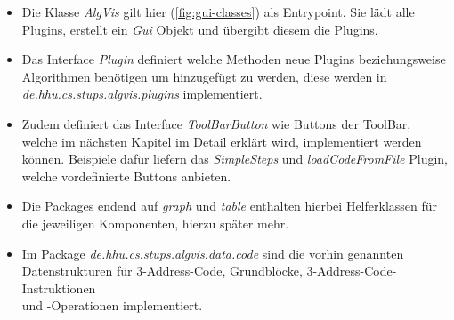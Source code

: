 \newpage
\begin{itemize}
  \item Die Klasse \textit{AlgVis} gilt hier (\cref{fig:gui-classes}) als Entrypoint. 
    Sie lädt alle Plugins, erstellt ein \textit{Gui} Objekt und übergibt diesem die Plugins.
  \item Das Interface \textit{Plugin} definiert welche Methoden neue Plugins
    beziehungsweise Algorithmen
    benötigen um hinzugefügt zu werden, diese werden in\\
    \textit{de.hhu.cs.stups.algvis.plugins} implementiert.
  \item Zudem definiert das Interface \textit{ToolBarButton} wie Buttons der ToolBar,
    welche im nächsten Kapitel im Detail erklärt wird, implementiert werden können.
    Beispiele dafür liefern das \textit{SimpleSteps} und \textit{loadCodeFromFile} Plugin,
    welche vordefinierte Buttons anbieten.
  \item Die Packages endend auf \textit{graph} und \textit{table} enthalten hierbei Helferklassen 
    für die jeweiligen Komponenten, hierzu später mehr.
  \item Im Package \textit{de.hhu.cs.stups.algvis.data.code} sind die vorhin genannten Datenstrukturen
    für 3-Address-Code, Grundblöcke, 3-Address-Code-Instruktionen\\ 
    und -Operationen implementiert.
\end{itemize}

